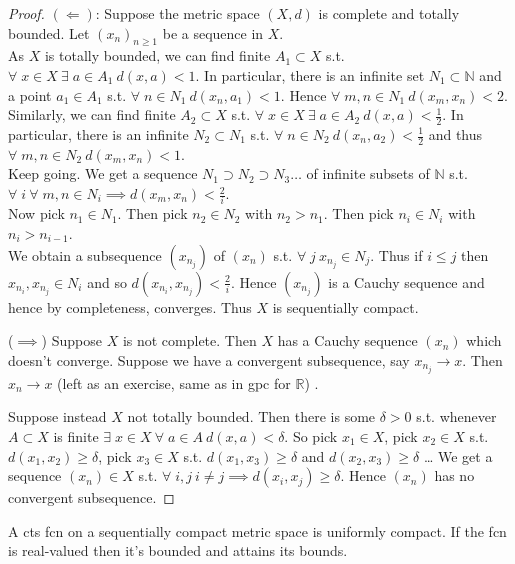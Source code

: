 \begin{proof}
    $(\Longleftarrow)$: Suppose the metric space $(X, d)$ is complete and totally bounded.
    Let $(x_n)_{n \geq 1}$ be a sequence in $X$. \\
    As $X$ is totally bounded, we can find finite $A_1 \subset X$ s.t. $\forall \; x \in X \ \exists \; a \in A_1 \ d(x, a) < 1$.
    In particular, there is an infinite set $N_1 \subset \mathbb{N}$ and a point $a_1 \in A_1$ s.t. $\forall \; n \in N_1 \ d(x_n, a_1) < 1$.
    Hence $\forall \; m, n \in N_1 \ d(x_m, x_n) < 2$. \\
    Similarly, we can find finite $A_2 \subset X$ s.t. $\forall \; x \in X \ \exists \; a \in A_2 \ d(x, a) < \frac{1}{2}$.
    In particular, there is an infinite $N_2 \subset N_1$ s.t. $\forall \; n \in N_2 \ d(x_n, a_2) < \frac{1}{2}$ and thus $\forall \; m, n \in N_2 \ d(x_m, x_n) < 1$. \\
    Keep going.
    We get a sequence $N_1 \supset N_2 \supset N_3 \dots$ of infinite subsets of $\mathbb{N}$ s.t. $\forall \; i \ \forall \; m, n \in N_i \implies d(x_m, x_n) < \frac{2}{i}$. \\
    Now pick $n_1 \in N_1$.
    Then pick $n_2 \in N_2$ with $n_2 > n_1$.
    Then pick $n_i \in N_i$ with $n_i > n_{i - 1}$. \\
    We obtain a subsequence $(x_{n_j})$ of $(x_n)$ s.t. $\forall \; j \ x_{n_j} \in N_j$.
    Thus if $i \leq j$ then $x_{n_i}, x_{n_j} \in N_i$ and so $d(x_{n_i}, x_{n_j}) < \frac{2}{i}$.
    Hence $(x_{n_j})$ is a Cauchy sequence and hence by completeness, converges.
    Thus $X$ is sequentially compact.

    ($\implies$) Suppose $X$ is not complete.
    Then $X$ has a Cauchy sequence $(x_n)$ which doesn't converge.
    Suppose we have a convergent subsequence, say $x_{n_j} \to x$.
    Then $x_n \to x$ (left as an exercise, same as in gpc for $\mathbb{R}$) \Lightning.

    Suppose instead $X$ not totally bounded.
    Then there is some $\delta > 0$ s.t. whenever $A \subset X$ is finite $\exists \; x \in X \ \forall \; a \in A \ d(x, a) < \delta$.
    So pick $x_1 \in X$, pick $x_2 \in X$ s.t. $d(x_1, x_2) \geq \delta$, pick $x_3 \in X$ s.t. $d(x_1, x_3) \geq \delta$ and $d(x_2, x_3) \geq \delta$ \dots
    We get a sequence $(x_n) \in X$ s.t. $\forall \; i, j \ i \neq j \implies d(x_i, x_j) \geq \delta$.
    Hence $(x_n)$ has no convergent subsequence.
\end{proof} 

\begin{exercise}
    A cts fcn on a sequentially compact metric space is uniformly compact.
    If the fcn is real-valued then it's bounded and attains its bounds.
\end{exercise} 

